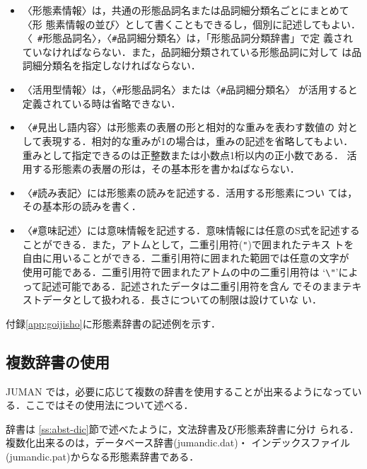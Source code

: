 \documentclass[a4j,titlepage]{jarticle}
\begin{document}
\begin{itemize}
\item
〈形態素情報〉は，共通の形態品詞名または品詞細分類名ごとにまとめて〈形
態素情報の並び〉として書くこともできるし，個別に記述してもよい．〈{\tt
\#}形態品詞名〉，〈{\tt \#}品詞細分類名〉は，「形態品詞分類辞書」で定
義されていなければならない．また，品詞細分類されている形態品詞に対して
は品詞細分類名を指定しなければならない．

\item
〈活用型情報〉は，〈{\tt \#}形態品詞名〉または〈{\tt \#}品詞細分類名〉
が活用すると定義されている時は省略できない．

\item
〈{\tt \#}見出し語内容〉は形態素の表層の形と相対的な重みを表わす数値の
対として表現する．相対的な重みが1の場合は，重みの記述を省略してもよい．
重みとして指定できるのは正整数または小数点1桁以内の正小数である．
活用する形態素の表層の形は，その基本形を書かねばならない．

\item
〈{\tt \#}読み表記〉には形態素の読みを記述する．活用する形態素につい
ては，その基本形の読みを書く．

\item 
〈{\tt \#}意味記述〉には意味情報を記述する．意味情報には任意のS式を記述する
ことができる．また，アトムとして，二重引用符({\tt "})で囲まれたテキス %
トを自由に用いることができる．二重引用符に囲まれた範囲では任意の文字が
使用可能である．二重引用符で囲まれたアトムの中の二重引用符は
`\verb#\"#'によって記述可能である．記述されたデータは二重引用符を含ん
でそのままテキストデータとして扱われる．長さについての制限は設けていな
い．

\end{itemize}

付録\ref{app:goijisho}に形態素辞書の記述例を示す．


\subsection{複数辞書の使用}
\label{ss:multi-dic}

JUMAN では，必要に応じて複数の辞書を使用することが出来るようになってい
る．ここではその使用法について述べる．

辞書は \ref{ss:abst-dic}節で述べたように，文法辞書及び形態素辞書に分け
られる．複数化出来るのは，データベース辞書(jumandic.dat)・
インデックスファイル(jumandic.pat)からなる形態素辞書である．
\end{document}
